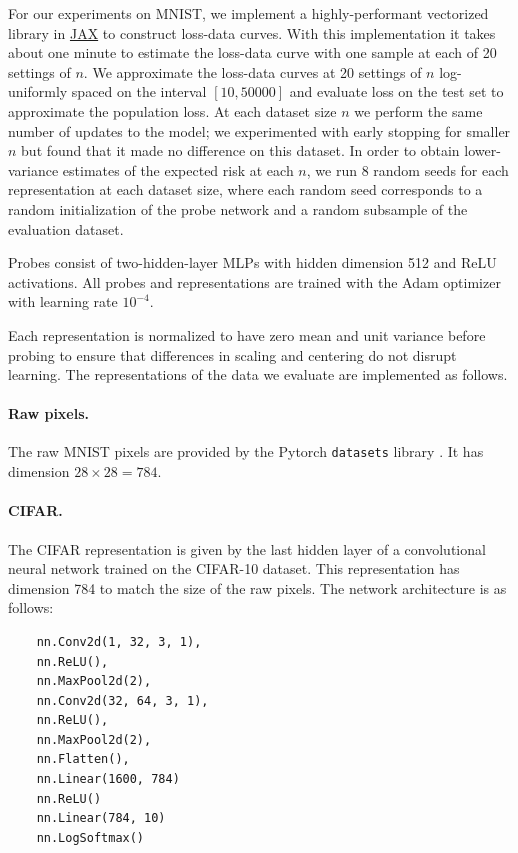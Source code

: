 \begin{subappendices}
For our experiments on MNIST, we implement a highly-performant vectorized library in \hyperlink{https://jax.readthedocs.io/en/latest/}{JAX} to construct loss-data curves.
With this implementation it takes about one minute to estimate the loss-data curve with one sample at each of 20 settings of $n$.
We approximate the loss-data curves at 20 settings of $n$ log-uniformly spaced on the interval $[10, 50000]$ and evaluate loss on the test set to approximate the population loss.
At each dataset size $n$ we perform the same number of updates to the model; we experimented with early stopping for smaller $n$ but found that it made no difference on this dataset.
In order to obtain lower-variance estimates of the expected risk at each $n$, we run 8 random seeds for each representation at each dataset size, where each random seed corresponds to a random initialization of the probe network and a random subsample of the evaluation dataset.

Probes consist of two-hidden-layer MLPs with hidden dimension 512 and ReLU activations.
All probes and representations are trained with the Adam optimizer \citep{Kingma2015AdamAM} with learning rate $10^{-4}$.

Each representation is normalized to have zero mean and unit variance before probing to ensure that differences in scaling and centering do not disrupt learning.
The representations of the data we evaluate are implemented as follows.

\paragraph{Raw pixels.}
The raw MNIST pixels are provided by the Pytorch \texttt{datasets} library \citep{Paszke2019PyTorchAI}.
It has dimension $28 \times 28 = 784$.

\paragraph{CIFAR.}
The CIFAR representation is given by the last hidden layer of a convolutional neural network trained on the CIFAR-10 dataset.
This representation has dimension 784 to match the size of the raw pixels.
The network architecture is as follows:

\begin{verbatim}
    nn.Conv2d(1, 32, 3, 1),
    nn.ReLU(),
    nn.MaxPool2d(2),
    nn.Conv2d(32, 64, 3, 1),
    nn.ReLU(),
    nn.MaxPool2d(2),
    nn.Flatten(),
    nn.Linear(1600, 784)
    nn.ReLU()
    nn.Linear(784, 10)
    nn.LogSoftmax()
\end{verbatim}


\end{subappendices}
